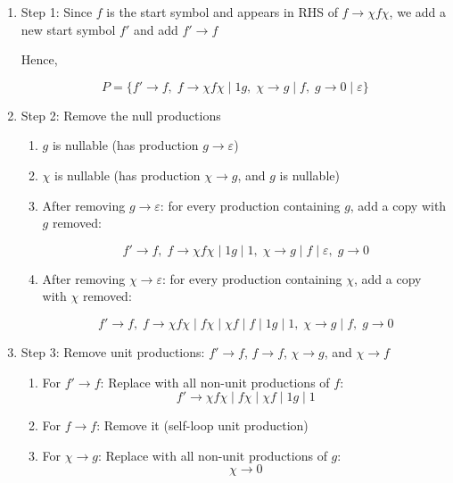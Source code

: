 \documentclass[12pt,a4paper,openany]{article}
\begin{document}
\begin{enumerate}
    \item Step 1: Since $f$ is the start symbol and appears in RHS of $f \to \chi f \chi$, we add a new start symbol $f'$ and add $f' \to f$
    
    Hence,

    \[
    P = \{f' \to f,\; f \to \chi f \chi \mid 1g,\; \chi \to g \mid f,\; g \to 0 \mid \varepsilon \}
    \]

    \item Step 2: Remove the null productions

    \begin{enumerate}
        \item $g$ is nullable (has production $g \to \varepsilon$)
        \item $\chi$ is nullable (has production $\chi \to g$, and $g$ is nullable)
        
        
        \item After removing $g \to \varepsilon$: for every production 
        containing $g$, add a copy with $g$ removed:

        \[
        f' \to f,\;
        f \to \chi f \chi \mid 1g \mid 1,\;
        \chi \to g \mid f \mid \varepsilon,\;
        g \to 0
        \]

        \item After removing $\chi \to \varepsilon$: for every production 
        containing $\chi$, add a copy with $\chi$ removed:

        \[
        f' \to f,\;
        f \to \chi f \chi \mid f\chi \mid \chi f \mid f \mid 1g \mid 1,\;
        \chi \to g \mid f,\;
        g \to 0
        \]

    \end{enumerate}

    \item Step 3: Remove unit productions: $f' \to f$, $f \to f$, $\chi \to g$, and $\chi \to f$
        
    \begin{enumerate}
        \item For $f' \to f$: Replace with all non-unit productions of $f$:
        \[
        f' \to \chi f\chi \mid f\chi \mid \chi f \mid 1g \mid 1
        \]

        \item For $f \to f$: Remove it (self-loop unit production)

        \item For $\chi \to g$: Replace with all non-unit productions of $g$:
        \[
        \chi \to 0
        \]


\end{enumerate}
\end{enumerate}
\end{document}
